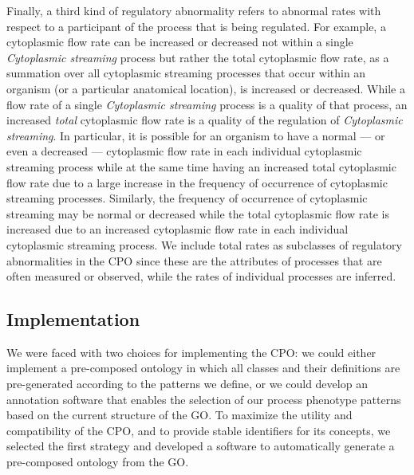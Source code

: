 \documentclass{bioinfo}
\begin{document}
Finally, a third kind of regulatory abnormality refers to abnormal
rates with respect to a participant of the process that is being
regulated. For example, a cytoplasmic flow rate can be increased or
decreased not within a single {\em Cytoplasmic streaming} process but
rather the total cytoplasmic flow rate, as a summation over all
cytoplasmic streaming processes that occur within an organism (or a
particular anatomical location), is increased or decreased. While a
flow rate of a single {\em Cytoplasmic streaming} process is a quality
of that process, an increased {\em total} cytoplasmic flow rate is a
quality of the regulation of {\em Cytoplasmic streaming}. In
particular, it is possible for an organism to have a normal --- or
even a decreased --- cytoplasmic flow rate in each individual
cytoplasmic streaming process while at the same time having an
increased total cytoplasmic flow rate due to a large increase in the
frequency of occurrence of cytoplasmic streaming processes. Similarly,
the frequency of occurrence of cytoplasmic streaming may be normal or
decreased while the total cytoplasmic flow rate is increased due to an
increased cytoplasmic flow rate in each individual cytoplasmic
streaming process. 
We include total rates as subclasses of regulatory abnormalities in
the CPO since these are the attributes of processes that are often
measured or observed, while the rates of individual processes are
inferred.

\subsection{Implementation}
We were faced with two choices for implementing the CPO: we could
either implement a pre-composed ontology in which all classes and
their definitions are pre-generated according to the patterns we
define, or we could develop an annotation software that enables the
selection of our process phenotype patterns based on the current
structure of the GO.  To maximize the utility and compatibility of the
CPO, and to provide stable identifiers for its concepts, we selected
the first strategy and developed a software to automatically generate
a pre-composed ontology from the GO.
\end{document}
